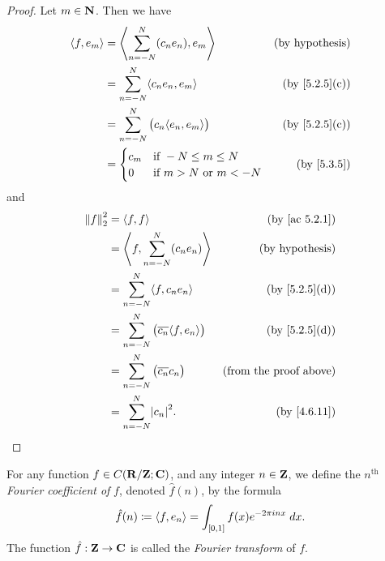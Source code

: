 \begin{proof}
  Let \(m \in \N\).
  Then we have
  \begin{align*}
    \inner*{f, e_m} & = \inner*{\sum_{n = -N}^N (c_n e_n), e_m}         & \text{(by hypothesis)}      \\
                    & = \sum_{n = -N}^N \inner*{c_n e_n, e_m}           & \text{(by \cref{5.2.5}(c))} \\
                    & = \sum_{n = -N}^N \big(c_n \inner*{e_n, e_m}\big) & \text{(by \cref{5.2.5}(c))} \\
                    & = \begin{cases}
                          c_m & \text{if } -N \leq m \leq N         \\
                          0   & \text{if } m > N \text{ or } m < -N
                        \end{cases}      & \text{(by \cref{5.3.5})}
  \end{align*}
  and
  \begin{align*}
    \norm*{f}_2^2 & = \inner*{f, f}                                            & \text{(by \cref{ac 5.2.1})}   \\
                  & = \inner*{f, \sum_{n = -N}^N (c_n e_n)}                    & \text{(by hypothesis)}        \\
                  & = \sum_{n = -N}^N \inner*{f, c_n e_n}                      & \text{(by \cref{5.2.5}(d))}   \\
                  & = \sum_{n = -N}^N \big(\overline{c_n} \inner*{f, e_n}\big) & \text{(by \cref{5.2.5}(d))}   \\
                  & = \sum_{n = -N}^N \big(\overline{c_n} c_n\big)             & \text{(from the proof above)} \\
                  & = \sum_{n = -N}^N \abs{c_n}^2.                             & \text{(by \cref{4.6.11})}
  \end{align*}
\end{proof}

\begin{definition}\label{5.3.7}
  For any function \(f \in C(\R / \Z ; \C)\), and any integer \(n \in \Z\), we define the \(n^{\text{th}}\) \emph{Fourier coefficient of} \(f\), denoted \(\hat{f}(n)\), by the formula
  \[
    \hat{f}(n) \coloneqq \inner*{f, e_n} = \int_{[0, 1]} f(x) e^{- 2 \pi i n x} \; dx.
  \]
  The function \(\hat{f} : \Z \to \C\) is called the \emph{Fourier transform} of \(f\).
\end{definition}

